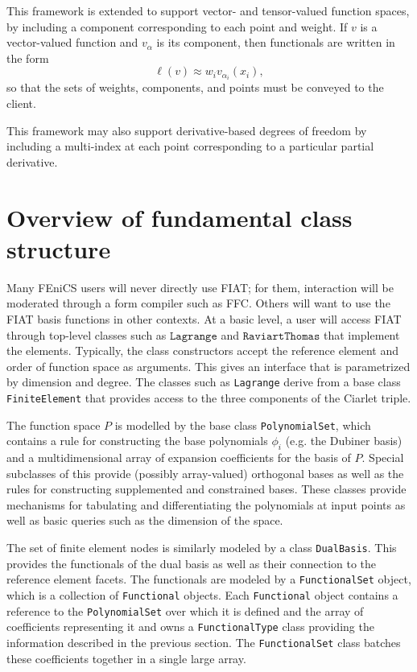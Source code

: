 This framework is extended to support vector- and tensor-valued function
spaces, by including a component corresponding to each point and weight.
If \( v \) is a vector-valued function and \( v_\alpha \) is its
component, then functionals are written in the form
\begin{equation}
\ell( v ) \approx w_i v_{\alpha_i}(x_i),
\end{equation}
so that the sets of weights, components, and points must be conveyed to
the client.

This framework may also support derivative-based degrees of freedom
by including a multi-index at each point corresponding to a particular
partial derivative.

\section{Overview of fundamental class structure}

Many FEniCS users will never directly use FIAT; for them, interaction
will be moderated through a form compiler such as FFC.
Others will want to use the FIAT basis functions in other contexts.
At a basic level, a user will access FIAT through top-level classes
such as \( \texttt{Lagrange} \) and \( \texttt{RaviartThomas} \) that
implement the elements.  Typically, the class constructors accept the
reference element and order of function space as arguments. This gives
an interface that is parametrized by dimension and degree. The classes
such as \texttt{Lagrange} derive from a base class \texttt{FiniteElement}
that provides access to the three components of the Ciarlet triple.

The function space \( P \) is modelled by the base class
\texttt{PolynomialSet}, which contains a rule for constructing the base
polynomials \( \phi_i \) (e.g. the Dubiner basis) and a multidimensional
array of expansion coefficients for the basis of \( P \).  Special
subclasses of this provide (possibly array-valued) orthogonal bases as
well as the rules for constructing supplemented and constrained bases.
These classes provide mechanisms for tabulating and differentiating
the polynomials at input points as well as basic queries such as the
dimension of the space.

The set of finite element nodes is similarly modeled by a class
\texttt{DualBasis}.  This provides the functionals of the dual basis as
well as their connection to the reference element facets.  The functionals
are modeled by a \texttt{FunctionalSet} object, which is a collection of
\texttt{Functional} objects.  Each \texttt{Functional} object contains a
reference to the \texttt{PolynomialSet} over which it is defined and the
array of coefficients representing it and owns a \texttt{FunctionalType}
class providing the information described in the previous section.
The \texttt{FunctionalSet} class batches these coefficients together in
a single large array.

